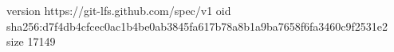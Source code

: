 version https://git-lfs.github.com/spec/v1
oid sha256:d7f4db4cfcec0ac1b4be0ab3845fa617b78a8b1a9ba7658f6fa3460c9f2531e2
size 17149
